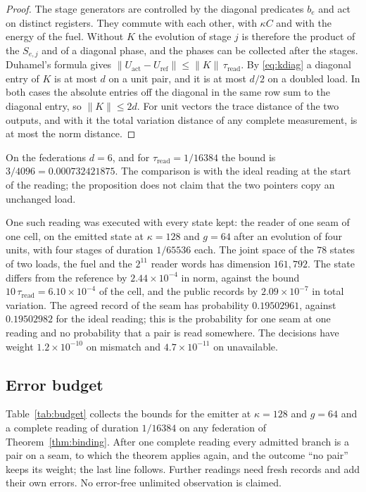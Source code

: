\documentclass[11pt]{article}
\theoremstyle{definition}
\theoremstyle{remark}
\theoremstyle{plain}
\begin{document}
\begin{proof}
The stage generators are controlled by the diagonal predicates $b_e$ and
act on distinct registers. They commute with each other, with $\kappa C$
and with the energy of the fuel. Without $K$ the evolution of stage $j$ is
therefore the product of the $S_{e,j}$ and of a diagonal phase, and the
phases can be collected after the stages. Duhamel's formula gives
$\lVert U_{\mathrm{act}}-U_{\mathrm{ref}}\rVert\le\lVert K\rVert\,\tau_{\mathrm{read}}$.
By \eqref{eq:kdiag} a diagonal entry of $K$ is at most $d$ on a unit pair,
and it is at most $d/2$ on a doubled load. In both cases the absolute
entries off the diagonal in the same row sum to the diagonal entry, so
$\lVert K\rVert\le2d$. For unit vectors the trace distance of
the two outputs, and with it the total variation distance of any complete
measurement, is at most the norm distance.
\end{proof}

On the federations $d=6$, and for $\tau_{\mathrm{read}}=1/16384$ the bound
is $3/4096=0.000732421875$. The comparison is with the ideal reading at the
start of the reading; the proposition does not claim that the two pointers
copy an unchanged load.

One such reading was executed with every state kept: the reader of one seam
of one cell, on the emitted state at $\kappa=128$ and $g=64$ after an
evolution of four units, with four stages of duration $1/65536$ each. The
joint space of the $78$ states of two loads, the fuel and the $2^{11}$
reader words has dimension $161{,}792$. The state differs from the
reference by $2.44\times10^{-4}$ in norm, against the bound
$10\,\tau_{\mathrm{read}}=6.10\times10^{-4}$ of the cell, and the public
records by $2.09\times10^{-7}$ in total variation. The agreed record of the
seam has probability $0.19502961$, against $0.19502982$ for the ideal
reading; this is the probability for one seam at one reading and no
probability that a pair is read somewhere. The decisions have weight
$1.2\times10^{-10}$ on mismatch and $4.7\times10^{-11}$ on unavailable.

\subsection{Error budget}

Table~\ref{tab:budget} collects the bounds for the emitter at $\kappa=128$
and $g=64$ and a complete reading of duration $1/16384$ on any federation
of Theorem~\ref{thm:binding}. After one complete reading every admitted
branch is a pair on a seam, to which the theorem applies again, and the
outcome ``no pair'' keeps its weight; the last line follows. Further
readings need fresh records and add their own errors. No error-free
unlimited observation is claimed.
\end{document}
